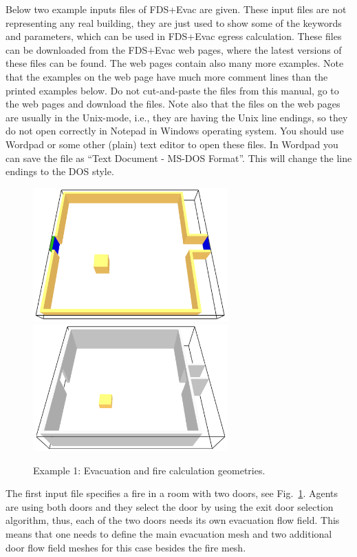 \documentclass[12pt,a4paper,final,twoside]{stylevk}
\begin{document}
\noindent Below two example inputs files of FDS+Evac are given.  These
input files are not representing any real building, they are just used
to show some of the keywords and parameters, which can be used in
FDS+Evac egress calculation.  These files can be downloaded from the
FDS+Evac web pages, where the latest versions of these files can be
found.  The web pages contain also many more examples.  Note that the
examples on the web page have much more comment lines than the printed
examples below.  Do not cut-and-paste the files from this manual, go
to the web pages and download the files.  Note also that the files on
the web pages are usually in the Unix-mode, i.e., they are
having the Unix line endings, so they do not open correctly in Notepad
in Windows operating system.  You should use Wordpad or some other
(plain) text editor to open these files.  In Wordpad you can save the
file as ``Text Document - MS-DOS Format''.  This will change the line
endings to the DOS style.


\begin{figure}[!b]
  \centerline{\includegraphics[clip=true,
    width=75mm]{FIGURES/evac_example1_EvacGeom} \includegraphics[clip=true,
    width=75mm]{FIGURES/evac_example1_FireGeom}}
  \caption{Example 1: Evacuation and fire calculation
    geometries.}\label{Fig_Ex1EvacGeom}
\end{figure}


The first input file specifies a fire in a room with two doors, see
Fig.~\ref{Fig_Ex1EvacGeom}.  Agents are using both doors and they
select the door by using the exit door selection algorithm, thus, each
of the two doors needs its own evacuation flow field.  This means that
one needs to define the main evacuation mesh and two additional door
flow field meshes for this case besides the fire mesh.
\vspace{\fill}
\end{document}
